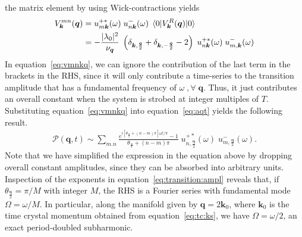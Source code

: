 \documentclass[preprint,5p,times,twocolumn]{elsarticle}
\newcommand{\bmk}{\bm{k}}
\newcommand{\bmq}{\bm{q}}
\begin{document}
the matrix element by using Wick-contractions yields
\begin{align}
    V^{mn}_{\bmk}(\bmq) &= u^{+\ast}_{m\bmk}(\omega)\;u^{-}_{n\bmk}(\omega)\;\mel{0}{V^R_{\bmk}(\bmq)}{0}\nonumber\\
    &= - \frac{|\lambda_0|^2}{\nu_{\bmq}}\;\left(\delta^{\;}_{\bmk,\frac{\bmq}{2}} + \delta^{\;}_{\bmk,-\frac{\bmq}{2}}  -2 \right)\;u_{n\bmk}^{+\ast}(\omega)\;u_{m,\bmk}^{-}(\omega)
    \label{eq:vmnkq}
\end{align}
In equation~\ref{eq:vmnkq},  we can ignore the contribution of the last term in the brackets in the RHS, since it will only contribute a time-series to the transition amplitude that has a fundamental frequency of $\omega\;,\forall\;\bmq$. Thus, it just contributes an overall constant when the system is strobed at integer multiples of $T$. Substituting equation~\ref{eq:vmnkq} into equation~\ref{eq:aqt} yields the following result.
\begin{multline}
    \mathcal{P}(\bmq, t) \sim  \sum_{m . n} \frac{e^{i\left[\theta_{\frac{\bmq}{2}}+\left(n-m\right)\pi\right]\omega t/\pi}-1}{\theta_\frac{\bmq}{2}+\left(n-m\right)\pi}\; u_{n,\frac{\bmq}{2}}^{+\ast}(\omega)\; u_{m,\frac{\bmq}{2}}^{-}(\omega).  
    \label{eq:transition:ampl}
\end{multline}
Note that we have simplified the expression in the equation above by dropping overall constant amplitudes, since they can be absorbed into arbitrary units. 
Inspection of the exponents in equation~\ref{eq:transition:ampl} reveals that, if $\theta_{\frac{\bmq}{2}}=\pi/M$ with integer $M$, the RHS is a Fourier series with fundamental mode $\Omega = \omega/M$. In particular, along the manifold given by $\bmq=2\bmk_0$, where $\bmk_0$ is the time crystal momentum obtained from equation~\ref{eq:tc:ks}, we have $\Omega = \omega/2$, an exact period-doubled subharmonic.
\end{document}

